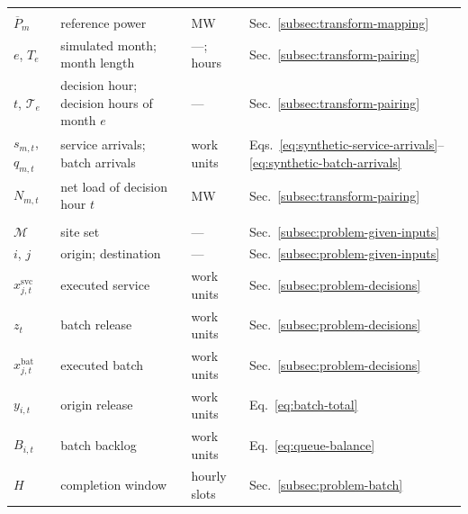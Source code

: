 \documentclass{UNCC-thesis}
\begin{document}
\begin{longtable}{@{}L{0.15\textwidth}L{0.37\textwidth}L{0.25\textwidth}L{0.13\textwidth}@{}}
  \addlinespace
   \\
  \(\overline P_m\) & reference power & MW & Sec.~\ref{subsec:transform-mapping} \\
  \(e\), \(T_e\) & simulated month; month length & ---; hours & Sec.~\ref{subsec:transform-pairing} \\
  \(t\), \(\mathcal T_e\) & decision hour; decision hours of month \(e\) & --- & Sec.~\ref{subsec:transform-pairing} \\
  \(s_{m,t}\), \(q_{m,t}\) & service arrivals; batch arrivals & work units & Eqs.~\eqref{eq:synthetic-service-arrivals}--\eqref{eq:synthetic-batch-arrivals} \\
  \(N_{m,t}\) & net load of decision hour \(t\) & MW & Sec.~\ref{subsec:transform-pairing} \\
  \addlinespace
   \\
  \(\mathcal M\) & site set & --- & Sec.~\ref{subsec:problem-given-inputs} \\
  \(i\), \(j\) & origin; destination & --- & Sec.~\ref{subsec:problem-given-inputs} \\
  \(x^{\mathrm{svc}}_{j,t}\) & executed service & work units & Sec.~\ref{subsec:problem-decisions} \\
  \(z_t\) & batch release & work units & Sec.~\ref{subsec:problem-decisions} \\
  \(x^{\mathrm{bat}}_{j,t}\) & executed batch & work units & Sec.~\ref{subsec:problem-decisions} \\
  \(y_{i,t}\) & origin release & work units & Eq.~\eqref{eq:batch-total} \\
  \(B_{i,t}\) & batch backlog & work units & Eq.~\eqref{eq:queue-balance} \\
  \(H\) & completion window & hourly slots & Sec.~\ref{subsec:problem-batch} \\

\end{longtable}
\end{document}
